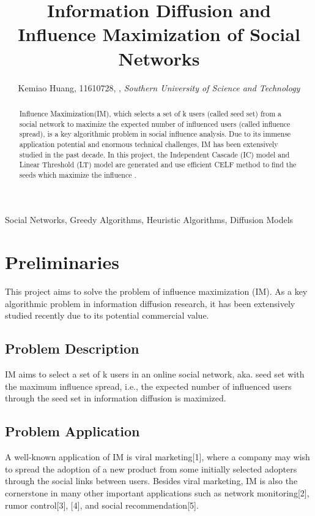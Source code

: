 \documentclass[9pt,shortpaper,twoside,web]{ieeecolor}
\begin{document}
\title{\bigskip\bigskip Information Diffusion and Influence Maximization of Social Networks}
\author{Kemiao Huang, 11610728, , \textit{Southern University of Science and Technology} }

\maketitle

\begin{abstract}
Influence Maximization(IM), which selects a set of k users (called seed set) from a social network to maximize the expected number of influenced users (called influence spread), is a key algorithmic problem in social influence analysis. Due to its immense application potential and enormous technical challenges, IM has been extensively studied in the past decade. In this project, the Independent Cascade (IC) model and Linear Threshold (LT) model are generated and use efficient CELF method to find the seeds which maximize the influence .
\end{abstract}

\begin{IEEEkeywords}
Social Networks, Greedy Algorithms, Heuristic Algorithms, Diffusion Models
\end{IEEEkeywords}
\bigskip
\section{Preliminaries}
This project aims to solve the problem of influence maximization (IM). As a key algorithmic problem in information diffusion research, it has been extensively studied recently due to its potential commercial value.

\subsection{Problem Description}
IM aims to select a set of k users in an online social network, aka. seed set with the maximum influence spread, i.e., the expected number of influenced users through the seed set in information diffusion is maximized. 
\subsection{Problem Application}
A well-known application of IM is viral marketing[1], where a company may wish to spread the adoption of a new product from some initially selected adopters through the social links between users. Besides viral marketing, IM is also the cornerstone in many other important applications such as network monitoring[2], rumor control[3], [4], and social recommendation[5].  
\bigskip
\end{document}
